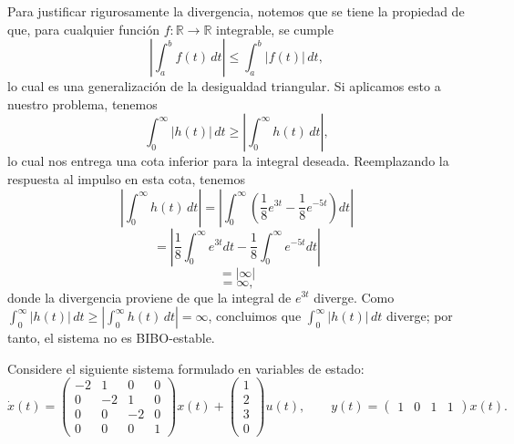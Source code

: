 \documentclass[
  11pt,
  letterpaper,
   addpoints,
   answers
  ]{exam}
\begin{document}
\begin{questions}
\begin{solution}
Para justificar rigurosamente la divergencia, notemos que se tiene la propiedad de que, para cualquier función $f:\mathbb{R}\to\mathbb{R}$ integrable, se cumple
\begin{equation}
\left|\int_{a}^{b} f(t)\,dt\right|
\le
\int_{a}^{b} |f(t)|\,dt,
\end{equation}
lo cual es una generalización de la desigualdad triangular. Si aplicamos esto a nuestro problema, tenemos
\begin{equation}
\int_{0}^{\infty} |h(t)|\,dt
\ge
\left|\int_{0}^{\infty} h(t)\,dt\right|,
\end{equation}
lo cual nos entrega una cota inferior para la integral deseada. Reemplazando la respuesta al impulso en esta cota, tenemos
\begin{equation}
\left|\int_{0}^{\infty} h(t)\,dt\right|
=
\left|\int_{0}^{\infty} \left(\frac{1}{8}e^{3t}-\frac{1}{8}e^{-5t}\right) dt \right|
\end{equation}
\begin{equation}
=
\left|\frac{1}{8}\int_{0}^{\infty} e^{3t} dt - \frac{1}{8}\int_{0}^{\infty} e^{-5t} dt \right|
\end{equation}
\begin{equation}
=\left| \infty \right|
\end{equation}
\begin{equation}
=\infty,
\end{equation}
donde la divergencia proviene de que la integral de $e^{3t}$ diverge. Como $\int_{0}^{\infty} |h(t)|\,dt \ge \left|\int_{0}^{\infty} h(t)\,dt\right| = \infty$, concluimos que $\int_{0}^{\infty} |h(t)|\,dt$ diverge; por tanto, el sistema no es BIBO-estable.
\end{solution}
\question Considere el siguiente sistema formulado en variables de estado:
\begin{equation}
  \dot{x}(t) =
  \begin{pmatrix}
    -2 & 1 & 0 & 0 \\
     0 & -2 & 1 & 0 \\
     0 &  0 & -2 & 0 \\
     0 &  0 &  0 & 1
  \end{pmatrix} x(t)
  +
  \begin{pmatrix}
    1 \\
    2 \\
    3 \\
    0
  \end{pmatrix} u(t),
  \qquad
  y(t) = \begin{pmatrix} 1 & 0 & 1 & 1 \end{pmatrix} x(t).
\end{equation}


\end{questions}
\end{document}
